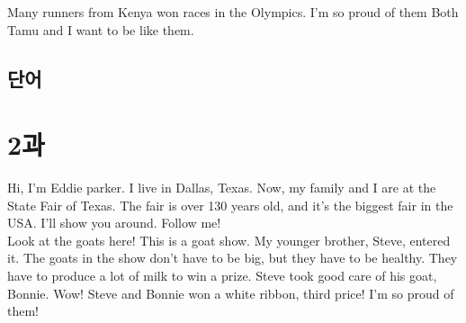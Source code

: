 \documentclass[9pt, a4paper]{oblivoir}
\begin{document}
        Many runners from Kenya won races in the Olympics. I'm so proud of them Both Tamu and I want to be like them. \bigskip
        \vspace*{2cm}

        \subsection*{단어}


            
            


            


            






        

        \newpage

        \section*{2과}

        Hi, I'm Eddie parker. I live in Dallas, Texas. Now, my family and I are at the State Fair of Texas. The fair is over 130 years old, and it's the biggest fair in the USA. I'll show you around. Follow me!
    \\

        Look at the goats here! This is a goat show. My younger brother, Steve, entered it. The goats in the show don't have to be big, but they have to be healthy. They have to produce a lot of milk to win a prize. Steve took good care of his goat, Bonnie. Wow! Steve and Bonnie won a white ribbon, third price! I'm so proud of them! 
    \\
\end{document}
